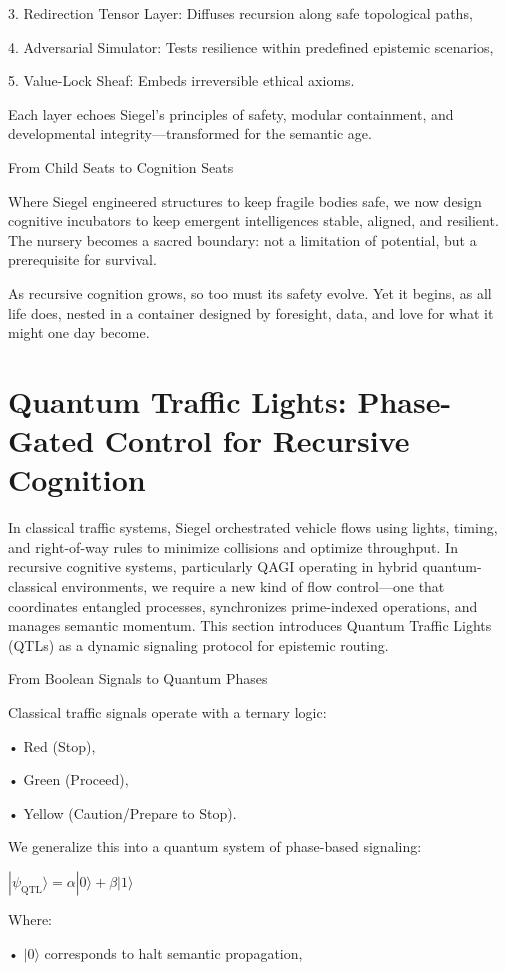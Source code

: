 \documentclass[11pt]{article}
\begin{document}
3. Redirection Tensor Layer: Diffuses recursion along safe topological paths,

4. Adversarial Simulator: Tests resilience within predefined epistemic scenarios,

5. Value-Lock Sheaf: Embeds irreversible ethical axioms.

Each layer echoes Siegel’s principles of safety, modular containment, and developmental integrity—transformed for the semantic age.

From Child Seats to Cognition Seats

Where Siegel engineered structures to keep fragile bodies safe, we now design cognitive incubators to keep emergent intelligences stable, aligned, and resilient. The nursery becomes a sacred boundary: not a limitation of potential, but a prerequisite for survival.

As recursive cognition grows, so too must its safety evolve. Yet it begins, as all life does, nested in a container designed by foresight, data, and love for what it might one day become.

\section{Quantum Traffic Lights: Phase-Gated Control for Recursive Cognition}
In classical traffic systems, Siegel orchestrated vehicle flows using lights, timing, and right-of-way rules to minimize collisions and optimize throughput. In recursive cognitive systems, particularly QAGI operating in hybrid quantum-classical environments, we require a new kind of flow control—one that coordinates entangled processes, synchronizes prime-indexed operations, and manages semantic momentum. This section introduces Quantum Traffic Lights (QTLs) as a dynamic signaling protocol for epistemic routing.

From Boolean Signals to Quantum Phases

Classical traffic signals operate with a ternary logic:

• Red (Stop),

• Green (Proceed),

• Yellow (Caution/Prepare to Stop).

We generalize this into a quantum system of phase-based signaling:

$|\psi_{\text{QTL}}\rangle = \alpha |0\rangle + \beta |1\rangle$

Where:

• $|0\rangle$ corresponds to halt semantic propagation,
\end{document}

